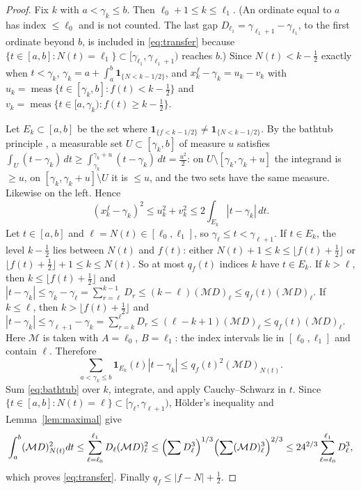\documentclass[11pt,a4paper]{article}
\makeatletter
\numberwithin{equation}{section}
\DeclareRobustCommand{\CGref}[1]{\ref{#1}}
\DeclareRobustCommand{\CGeqref}[1]{\eqref{#1}}
\DeclareRobustCommand{\CGcite}[2][]{\if\relax\detokenize{#1}\relax\cite{#2}\else\cite[#1]{#2}\fi}
\let\CG@origref\ref
\let\CG@origeqref\eqref
\newcommand{\CG@gettip}[1]{\@ifundefined{CGTip@#1}{#1}{\csname CGTip@#1\endcsname}}
\newcommand{\CG@getbib}[1]{\@ifundefined{CGBib@#1}{#1}{\csname CGBib@#1\endcsname}}
\DeclareRobustCommand{\CGref}[1]{\pdftooltip{\CG@origref{#1}}{\CG@gettip{#1}}}
\DeclareRobustCommand{\CGeqref}[1]{\pdftooltip{\CG@origeqref{#1}}{\CG@gettip{#1}}}
\DeclareRobustCommand{\CGcite}[2][]{\pdftooltip{\if\relax\detokenize{#1}\relax\cite{#2}\else\cite[#1]{#2}\fi}{\CG@getbib{#2}}}
\theoremstyle{definition}
\theoremstyle{remark}
\newcommand{\M}{\mathcal M}
\newcommand{\Ind}{\mathbf 1}
\newcommand{\meas}{\operatorname{meas}}
\makeatother
\begin{document}
\begin{proof}
Fix $k$ with $a<\gamma_k\le b$. Then $\ell_0+1\le k\le\ell_1$. (An ordinate equal to $a$ has index $\le\ell_0$ and is not counted. The last gap $D_{\ell_1}=\gamma_{\ell_1+1}-\gamma_{\ell_1}$, to the first ordinate beyond $b$, is included in \CGeqref{eq:transfer} because $\{t\in[a,b]:N(t)=\ell_1\}\subset[\gamma_{\ell_1},\gamma_{\ell_1+1})$ reaches $b$.) Since $N(t)<k-\frac12$ exactly when $t<\gamma_k$, $\gamma_k=a+\int_a^b\Ind_{\{N<k-1/2\}}$, and $x^f_k-\gamma_k=u_k-v_k$ with $u_k=\meas\{t\in[\gamma_k,b]:f(t)<k-\frac12\}$ and $v_k=\meas\{t\in[a,\gamma_k):f(t)\ge k-\frac12\}$.

Let $E_k\subset[a,b]$ be the set where $\Ind_{\{f<k-1/2\}}\ne\Ind_{\{N<k-1/2\}}$. By the bathtub principle \CGcite[Thm.~1.14]{LiebLoss2001}, a measurable set $U\subset[\gamma_k,b]$ of measure $u$ satisfies $\int_U(t-\gamma_k)\,dt\ge\int_{\gamma_k}^{\gamma_k+u}(t-\gamma_k)\,dt=\frac{u^2}2$: on $U\setminus[\gamma_k,\gamma_k+u]$ the integrand is $\ge u$, on $[\gamma_k,\gamma_k+u]\setminus U$ it is $\le u$, and the two sets have the same measure. Likewise on the left. Hence
\begin{equation}
(x^f_k-\gamma_k)^2\le u_k^2+v_k^2\le2\int_{E_k}|t-\gamma_k|\,dt .
\label{eq:bathtub}
\end{equation}
Let $t\in[a,b]$ and $\ell=N(t)\in[\ell_0,\ell_1]$, so $\gamma_\ell\le t<\gamma_{\ell+1}$. If $t\in E_k$, the level $k-\frac12$ lies between $N(t)$ and $f(t)$: either $N(t)+1\le k\le\lfloor f(t)+\frac12\rfloor$ or $\lfloor f(t)+\frac12\rfloor+1\le k\le N(t)$. So at most $q_f(t)$ indices $k$ have $t\in E_k$. If $k>\ell$, then $k\le\lfloor f(t)+\frac12\rfloor$ and $|t-\gamma_k|\le\gamma_k-\gamma_\ell=\sum_{r=\ell}^{k-1}D_r\le(k-\ell)(\M D)_\ell\le q_f(t)(\M D)_\ell$. If $k\le\ell$, then $k>\lfloor f(t)+\frac12\rfloor$ and $|t-\gamma_k|\le\gamma_{\ell+1}-\gamma_k=\sum_{r=k}^{\ell}D_r\le(\ell-k+1)(\M D)_\ell\le q_f(t)(\M D)_\ell$. Here $\M$ is taken with $A=\ell_0$, $B=\ell_1$: the index intervals lie in $[\ell_0,\ell_1]$ and contain $\ell$. Therefore
\[
\sum_{a<\gamma_k\le b}\Ind_{E_k}(t)|t-\gamma_k|\le q_f(t)^2(\M D)_{N(t)} .
\]
Sum \CGeqref{eq:bathtub} over $k$, integrate, and apply Cauchy--Schwarz in $t$. Since $\{t\in[a,b]:N(t)=\ell\}\subset[\gamma_\ell,\gamma_{\ell+1})$, H\"older's inequality and Lemma~\CGref{lem:maximal} give
\[
\int_a^b(\M D)_{N(t)}^2dt\le\sum_{\ell=\ell_0}^{\ell_1}D_\ell(\M D)_\ell^2\le\Bigl(\sum D_\ell^3\Bigr)^{1/3}\Bigl(\sum(\M D)_\ell^3\Bigr)^{2/3}\le24^{2/3}\sum_{\ell=\ell_0}^{\ell_1}D_\ell^3 ,
\]
which proves \CGeqref{eq:transfer}. Finally $q_f\le|f-N|+\frac12$.
\end{proof}
\end{document}
